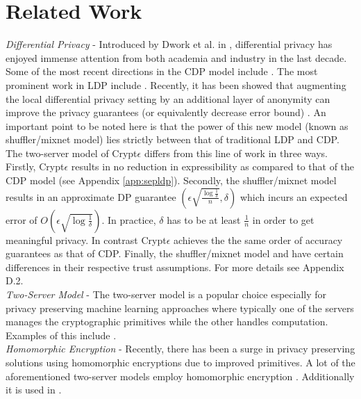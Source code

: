 \section{Related Work}\label{sec:related-short}
\textit{Differential Privacy }- Introduced by Dwork et al. in \cite{Dork}, differential privacy has enjoyed immense attention from both academia and industry in the last decade. Some of the most recent directions in the \textsf{CDP} model include \cite{MVG,Blocki,AHP,DAWA,hist1,hist2,hist3,hist4,hist6,hist7,hist8,A1,A2,A3,A4,A5,A6,A7,A8,u1,u2,MWEM}. The most prominent work in \textsf{LDP} include \cite{LDP1, LDP2, Rappor1,HH,Rappor2,HH2,Cormode, CALM,15,itemset}.
Recently, it has been showed that augmenting the local differential privacy setting by an additional layer of anonymity can improve the privacy
guarantees (or equivalently decrease error bound) \cite{mixnets,Prochlo,amplification}.  An important point to be noted here is that the power of this new model (known as shuffler/mixnet model) lies strictly between that of traditional \textsf{LDP} and \textsf{CDP}. The two-server model of Crypt$\epsilon$ differs from this line of work in three ways. Firstly, Crypt$\epsilon$ results in no reduction in expressibility as compared to that of the \textsf{CDP} model (see Appendix \ref{app:sepldp}). Secondly, the shuffler/mixnet model results in an approximate DP guarantee $(\epsilon\sqrt{\frac{\log\frac{1}{\delta}}{n}},\delta)$ which incurs an expected error of $O(\epsilon\sqrt{\log\frac{1}{\delta}})$.  In practice, $\delta$ has to be at least $\frac{1}{n}$ in order to get meaningful privacy. In contrast Crypt$\epsilon$ achieves the the same order of accuracy guarantees as that of \textsf{CDP}. Finally, the shuffler/mixnet model and \system have certain differences in their respective trust assumptions. For more details see Appendix D.2. %
\\\textit{Two-Server Model} - The two-server model is a popular choice especially for privacy preserving machine learning approaches where typically one of the servers manages the cryptographic primitives while the other handles computation. Examples of this include \cite{Boneh1,Boneh2,Ridge2,Matrix2,secureML,LReg,Ver}. \\\textit{Homomorphic Encryption } - Recently, there has been a surge in  privacy preserving solutions using homomorphic encryptions due to improved primitives. A lot of the aforementioned two-server models employ homomorphic encryption \cite{Boneh1,Boneh2,LReg,Matrix2}.  Additionally it is used in \cite{CryptoDL,CryptoNet,NN, Irene2, grid}.

